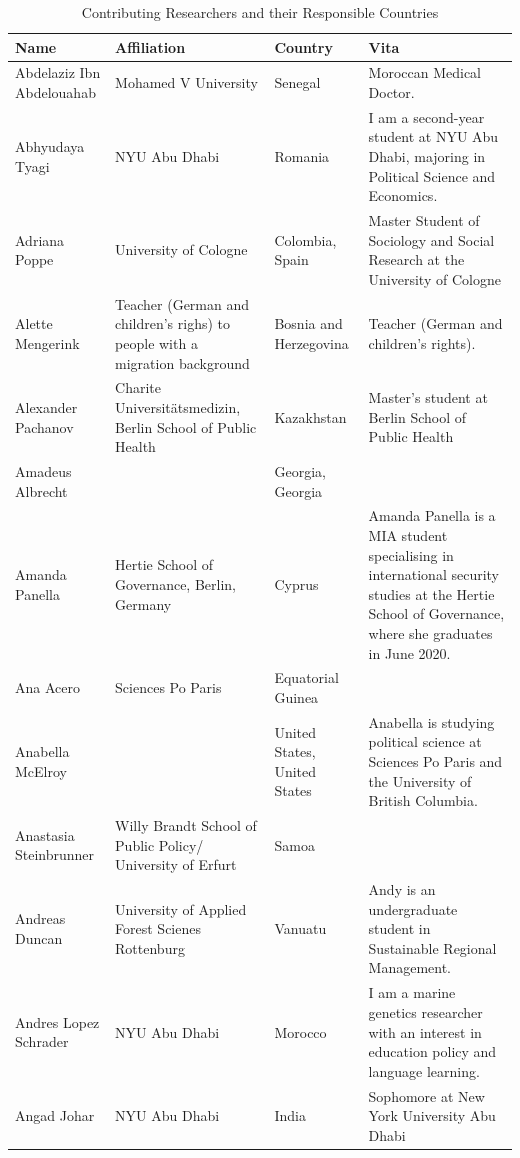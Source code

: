 \documentclass[]{article}
\begin{document}
\begin{longtable}{l>{\raggedright\arraybackslash}p{2cm}>{\raggedright\arraybackslash}p{2cm}>{\raggedright\arraybackslash}p{3cm}}
\caption{\label{tab:ratable}Contributing Researchers and their Responsible Countries}\\
\toprule
Name & Affiliation & Country & Vita\\
\midrule
\rowcolor{gray!6}  Abdelaziz Ibn Abdelouahab & Mohamed V University & Senegal & Moroccan Medical Doctor.\\
Abhyudaya Tyagi & NYU Abu Dhabi & Romania & I am a second-year student at NYU Abu Dhabi, majoring in Political Science and Economics.\\
\rowcolor{gray!6}  Adriana Poppe & University of Cologne & Colombia, Spain & Master Student of Sociology and Social Research at the University of Cologne\\
Alette Mengerink & Teacher (German and children's righs) to people with a migration background & Bosnia and Herzegovina & Teacher (German and children’s rights).\\
\rowcolor{gray!6}  Alexander Pachanov & Charite Universitätsmedizin, Berlin School of Public Health & Kazakhstan & Master's student at Berlin School of Public Health\\
\addlinespace
Amadeus Albrecht &  & Georgia, Georgia & \\
\rowcolor{gray!6}  Amanda Panella & Hertie School of Governance, Berlin, Germany & Cyprus & Amanda Panella is a MIA student specialising in international security studies at the Hertie School of Governance, where she graduates in June 2020.\\
Ana Acero & Sciences Po Paris & Equatorial Guinea & \\
\rowcolor{gray!6}  Anabella McElroy &  & United States, United States & Anabella is studying political science at Sciences Po Paris and the University of British Columbia.\\
Anastasia Steinbrunner & Willy Brandt School of Public Policy/ University of Erfurt & Samoa & \\
\addlinespace
\rowcolor{gray!6}  Andreas Duncan & University of Applied Forest Scienes Rottenburg & Vanuatu & Andy is an undergraduate student in Sustainable Regional Management.\\
Andres Lopez Schrader & NYU Abu Dhabi & Morocco & I am a marine genetics researcher with an interest in education policy and language learning.\\
\rowcolor{gray!6}  Angad Johar & NYU Abu Dhabi & India & Sophomore at New York University Abu Dhabi\\

\end{longtable}
\end{document}
